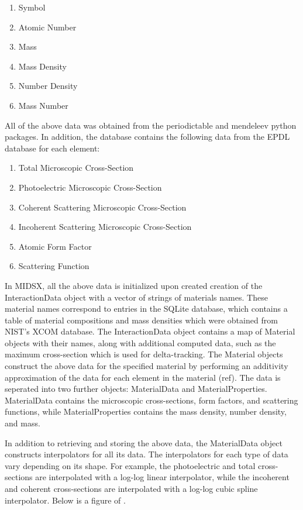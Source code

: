 \documentclass[%
 aip,
cp,  %
 amsmath,amssymb,%
reprint,%
]{revtex4-2}
\begin{document}
\begin{enumerate}
    \item Symbol
    \item Atomic Number
    \item Mass
    \item Mass Density
    \item Number Density
    \item Mass Number
\end{enumerate}

All of the above data was obtained from the periodictable and mendeleev python packages. In addition, the database contains the following data from the EPDL database for each element:

\begin{enumerate}
    \item Total Microscopic Cross-Section
    \item Photoelectric Microscopic Cross-Section
    \item Coherent Scattering Microscopic Cross-Section
    \item Incoherent Scattering Microscopic Cross-Section
    \item Atomic Form Factor
    \item Scattering Function
\end{enumerate}

\par In MIDSX, all the above data is initialized upon created creation of the InteractionData object with a vector of strings of materials names. These material names correspond to entries in the SQLite database, which contains a table of material compositions and mass densities which were obtained from NIST's XCOM database. The InteractionData object contains a map of Material objects with their names, along with additional computed data, such as the maximum cross-section which is used for delta-tracking. The Material objects construct the above data for the specified material by performing an additivity approximation of the data for each element in the material (ref). The data is seperated into two further objects: MaterialData and MaterialProperties. MaterialData contains the microscopic cross-sections, form factors, and scattering functions, while MaterialProperties contains the mass density, number density, and mass.

In addition to retrieving and storing the above data, the MaterialData object constructs interpolators for all its data. The interpolators for each type of data vary depending on its shape. For example, the photoelectric and total cross-sections are interpolated with a log-log linear interpolator, while the incoherent and coherent cross-sections are interpolated with a log-log cubic spline interpolator. Below is a figure of .\\
\end{document}
